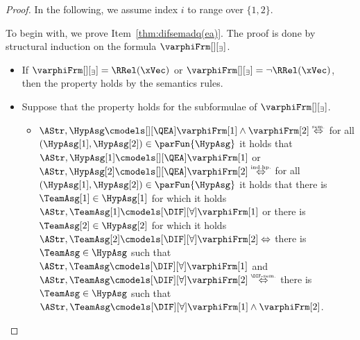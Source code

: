 \documentclass[authoryear]{elsarticle}
\newcommand{\iffExpl}[1]{\mathrel{\stackrel{\text{\tiny #1}}{\Leftrightarrow}}}
\begin{document}
\thmdifsemadq*
%
\begin{proof}
  In the following, we assume index $i$ to range over $\{1,2\}$.

  To begin with, we prove Item~\ref{thm:difsemadq(ea)}.
  The proof is done by structural induction on the formula
  $\varphiFrm[][_\exists]$.
  \begin{itemize}
  \item[(base case)] If $\varphiFrm[][_\exists]=\RRel(\xVec)$ or
    $\varphiFrm[][_\exists]= \neg \RRel(\xVec)$, then the property holds by the
    semantics rules.
  \item[(inductive cases)] Suppose that the property holds for the subformulae
    of $\varphiFrm[][_\exists]$.
    \begin{itemize}
    \item[{($\varphiFrm[][_\exists]=\varphiFrm[1] \land \varphiFrm[2]$)}]
      $\AStr, \HypAsg \cmodels[][\QEA] \varphiFrm[1] \wedge \varphiFrm[2]
      \iffExpl{sem.}$ for all $(\HypAsg[1],\HypAsg[2])\in\parFun{\HypAsg}$ it
      holds that $\AStr, \HypAsg[1] \cmodels[][\QEA] \varphiFrm[1]$ or $\AStr,
      \HypAsg[2] \cmodels[][\QEA] \varphiFrm[2] \iffExpl{ind.hp.}$ for all
      $(\HypAsg[1],\HypAsg[2])\in\parFun{\HypAsg}$ it holds that there is
      $\TeamAsg[1] \in \HypAsg[1]$ for which it holds $\AStr, \TeamAsg[1]
      \cmodels[\DIF][\forall] \varphiFrm[1]$ or there is $\TeamAsg[2] \in
      \HypAsg[2]$ for which it holds $\AStr, \TeamAsg[2] \cmodels[\DIF][\forall]
      \varphiFrm[2] \iffExpl{}$ there is $\TeamAsg \in \HypAsg$ such that
      $\AStr, \TeamAsg \cmodels[\DIF][\forall] \varphiFrm[1]$ and $\AStr,
      \TeamAsg \cmodels[\DIF][\forall] \varphiFrm[2] \iffExpl{\DIF-sem.}$ there
      is $\TeamAsg \in \HypAsg$ such that $\AStr, \TeamAsg
      \cmodels[\DIF][\forall] \varphiFrm[1] \wedge \varphiFrm[2]$.


\end{itemize}
\end{itemize}
\end{proof}
\end{document}
